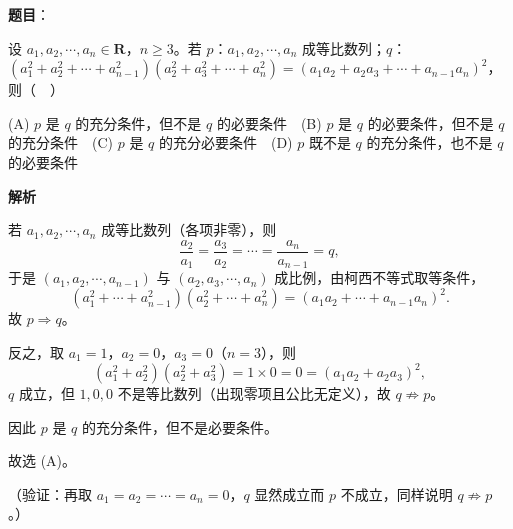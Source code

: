 \begin{answer}

\textbf{题目}：

设 \(a_1,a_2,\cdots,a_n\in\mathbf{R}\)，\(n\geqslant3\)。若 \(p\)：\(a_1,a_2,\cdots,a_n\) 成等比数列；\(q\)：\((a_1^2+a_2^2+\cdots+a_{n-1}^2)(a_2^2+a_3^2+\cdots+a_n^2)=(a_1a_2+a_2a_3+\cdots+a_{n-1}a_n)^2\)，则（　）

(A) \(p\) 是 \(q\) 的充分条件，但不是 \(q\) 的必要条件　(B) \(p\) 是 \(q\) 的必要条件，但不是 \(q\) 的充分条件　(C) \(p\) 是 \(q\) 的充分必要条件　(D) \(p\) 既不是 \(q\) 的充分条件，也不是 \(q\) 的必要条件

\textbf{解析}

若 \(a_1,a_2,\cdots,a_n\) 成等比数列（各项非零），则
\nopagebreak[4]
\[
\dfrac{a_2}{a_1}=\dfrac{a_3}{a_2}=\cdots=\dfrac{a_n}{a_{n-1}}=q,
\]
于是 \((a_1,a_2,\cdots,a_{n-1})\) 与 \((a_2,a_3,\cdots,a_n)\) 成比例，由柯西不等式取等条件，
\nopagebreak[4]
\[
(a_1^2+\cdots+a_{n-1}^2)(a_2^2+\cdots+a_n^2)=(a_1a_2+\cdots+a_{n-1}a_n)^2.
\]
故 \(p\Rightarrow q\)。

反之，取 \(a_1=1\)，\(a_2=0\)，\(a_3=0\)（\(n=3\)），则
\nopagebreak[4]
\[
(a_1^2+a_2^2)(a_2^2+a_3^2)=1\times0=0=(a_1a_2+a_2a_3)^2,
\]
\(q\) 成立，但 \(1,0,0\) 不是等比数列（出现零项且公比无定义），故 \(q\not\Rightarrow p\)。

因此 \(p\) 是 \(q\) 的充分条件，但不是必要条件。

故选 (A)。

（验证：再取 \(a_1=a_2=\cdots=a_n=0\)，\(q\) 显然成立而 \(p\) 不成立，同样说明 \(q\not\Rightarrow p\)。）


\end{answer}
